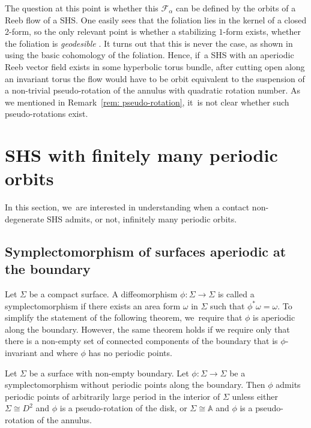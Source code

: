 The question at this point is whether this $\mathcal{F}_\alpha$ can be defined by the orbits of a Reeb flow of a SHS. One easily sees that the foliation lies in the kernel of a closed 2-form, so the only relevant point is whether a stabilizing $1$-form exists, \ie whether the foliation is \emph{geodesible} \cite{Sul}. It turns out that this is never the case, as shown in \cite[Rem.\,2.1]{Ac} using the basic cohomology of the foliation. Hence, if~a SHS with an aperiodic Reeb vector field exists in some hyperbolic torus bundle, after cutting open along an invariant torus the flow would have to be orbit equivalent to the suspension of a non-trivial pseudo-rotation of the annulus with quadratic rotation number. As we mentioned in Remark~\ref{rem: pseudo-rotation}, it~is not clear whether such pseudo-rotations exist.

\section{SHS with finitely many periodic orbits}\label{s:finite}

In this section, we~are interested in understanding when a contact non-degenerate SHS admits, or not, infinitely many periodic orbits.

\subsection{Symplectomorphism of surfaces aperiodic at the boundary}

Let $\Sigma$ be a compact surface. A diffeomorphism $\phi:\Sigma \to \Sigma$ is called a symplectomorphism if there exists an area form $\omega$ in $\Sigma$ such that $\phi^*\omega=\omega$. To simplify the statement of the following theorem, we~require that $\phi$ is aperiodic along the boundary. However, the same theorem holds if we require only that there is a non-empty set of connected components of the boundary that is $\phi$-invariant and where $\phi$ has no periodic points.

\begin{theorem} \label{thm:surfirra}
Let $\Sigma$ be a surface with non-empty boundary. Let $\phi:\Sigma \to \Sigma$ be a symplectomorphism without periodic points along the boundary. Then $\phi$ admits periodic points of arbitrarily large period in the interior of $\Sigma$ unless either $\Sigma\cong D^2$ and $\phi$ is a pseudo-rotation of the disk, or $\Sigma \cong \mathbb{A}$ and $\phi$ is a pseudo-rotation of the annulus.
\end{theorem}

